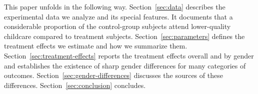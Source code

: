 This paper unfolds in the following way. Section~\ref{sec:data} describes the experimental data we analyze and its special features. It documents that a considerable proportion of the control-group subjects attend lower-quality childcare compared to treatment subjects. Section~\ref{sec:parameters} defines the treatment effects we estimate and how we summarize them. Section~\ref{sec:treatment-effects} reports the treatment effects overall and by gender and establishes the existence of sharp gender differences for many categories of outcomes. Section~\ref{sec:gender-differences} discusses the sources of these differences. Section~\ref{sec:conclusion} concludes.


